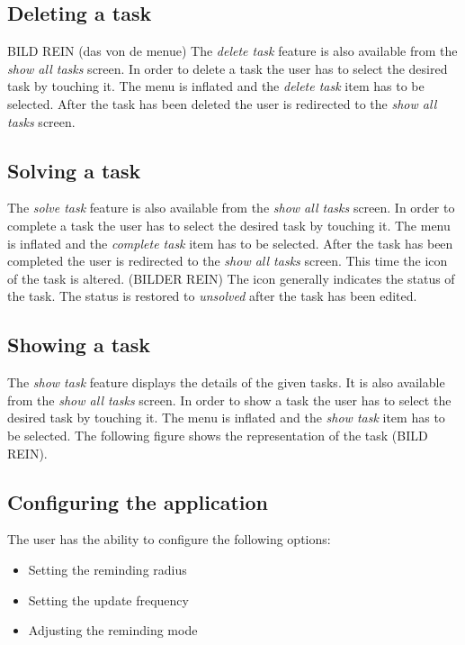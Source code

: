 \subsection{Deleting a task}
BILD REIN (das von de menue)
The \emph{delete task} feature is also available from the \emph{show all tasks}
screen. In order to delete a task the user has to select the desired task by
touching it. The menu is inflated and the \emph{delete task} item has to be
selected. After the task has been deleted the user is redirected to the
\emph{show all tasks} screen.
\newline
\newline
\subsection{Solving a task}
The \emph{solve task} feature is also available from the \emph{show all tasks}
screen. In order to complete a task the user has to select the
desired task by touching it. The menu is inflated and the \emph{complete task}
item has to be selected. After the task has been completed the user is
redirected to the \emph{show all tasks} screen. This time the icon of the task
is altered. (BILDER REIN) The icon generally indicates the status of the task.
The status is restored to \emph{unsolved} after the task has been edited.
\newline
\newline
\subsection{Showing a task}
The \emph{show task} feature displays the details of the given tasks. It is also
available from the \emph{show all tasks} screen. In order to show a task the
user has to select the desired task by touching it. The menu is inflated and the
\emph{show task} item has to be selected. The following figure shows the
representation of the task (BILD REIN).
\subsection{Configuring the application}
The user has the ability to configure the following options:
\begin{itemize}
  \item Setting the reminding radius
  \item Setting the update frequency
  \item Adjusting the reminding mode
\end{itemize}
